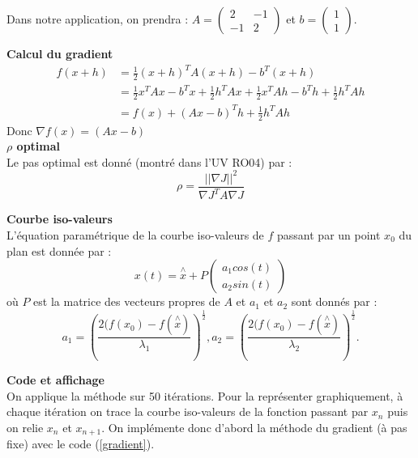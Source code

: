 \documentclass[a4paper,10pt]{report}
\begin{document}
Dans notre application, on prendra : $A = \left( \begin{array}{cc} 2 & -1 \\ -1 & 2 \end{array} \right)$ et $b=\left( \begin{array}{c} 1 \\ 1 \end{array} \right)$.

\textbf{Calcul du gradient}\\
\begin{align*}
f(x+h) & = \frac{1}{2}(x+h)^TA(x+h) - b^T(x+h) \\
	   & = \frac{1}{2}x^TAx - b^Tx + \frac{1}{2}h^TAx + \frac{1}{2}x^TAh -b^Th + \frac{1}{2}h^TAh \\
	   & = f(x) + (Ax-b)^Th + \frac{1}{2}h^TAh
\end{align*}
Donc $\nabla f(x) = (Ax-b)$ \\

\textbf{$\rho$ optimal}\\
Le pas optimal est donné (montré dans l'UV RO04) par :
\abovedisplayskip=0mm
\begin{displaymath}
\rho = \frac{||\nabla J||^2}{\nabla J^TA\nabla J}
\end{displaymath}

\textbf{Courbe iso-valeurs}\\
L'équation paramétrique de la courbe iso-valeurs de $f$ passant par un point $x_0$ du plan est donnée par :
\abovedisplayskip=0mm
\begin{displaymath}
x(t)= \overset{\wedge}{x} + P\left( \begin{array}{c} a_1cos(t) \\ a_2sin(t) \end{array} \right)
\end{displaymath}
où $P$ est la matrice des vecteurs propres de $A$ et $a_1$ et $a_2$ sont donnés par :
\abovedisplayskip=0mm
\begin{displaymath}
a_1= \left( \frac{2(f(x_0)-f(\overset{\wedge}{x})}{\lambda_1} \right)^\frac{1}{2}, a_2= \left( \frac{2(f(x_0)-f(\overset{\wedge}{x})}{\lambda_2} \right)^\frac{1}{2}.
\end{displaymath}

\textbf{Code et affichage}\\
On applique la méthode sur 50 itérations. Pour la représenter graphiquement, à chaque itération on trace la courbe iso-valeurs de la fonction passant par $x_n$ puis on relie $x_n$ et $x_{n+1}$. On implémente donc d'abord la méthode du gradient (à pas fixe) avec le code (\ref{gradient}).
\end{document}
